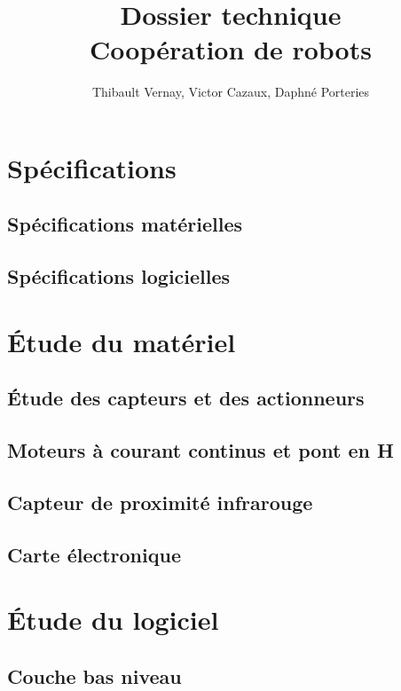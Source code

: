 \documentclass{article}
\title{Dossier technique\\Coopération de robots}
\author{Thibault Vernay, Victor Cazaux, Daphné Porteries}
\begin{document}
\maketitle

\tableofcontents

\section{Spécifications}

\subsection{Spécifications matérielles}

\subsection{Spécifications logicielles}

\section{Étude du matériel}

\subsection{Étude des capteurs et des actionneurs}

\subsection{Moteurs à courant continus et pont en H}

\subsection{Capteur de proximité infrarouge}

\subsection{Carte électronique}

\section{Étude du logiciel}

\subsection{Couche bas niveau}
\end{document}
